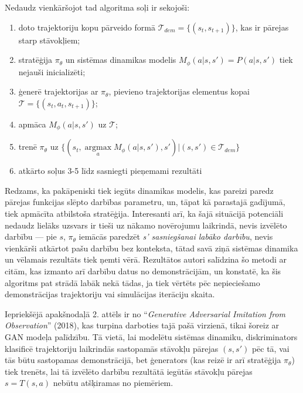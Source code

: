 \documentclass[12pt, a4paper]{article}
\numberwithin{equation}{section} %
\begin{document}
Nedaudz vienkāršojot tad algoritma soļi ir sekojoši:

\begin{enumerate}
    \item doto trajektoriju kopu pārveido formā $\mathcal{T}_{dem}=\lbrace (s_t, s_{t+1}) \rbrace$, kas ir pārejas starp stāvokļiem;
    \item stratēģija $\pi_{\theta}$ un sistēmas dinamikas modelis $M_{\phi}(a \vert s,s')=P(a \vert s, s')$ tiek nejauši inicializēti;
    \item ģenerē trajektorijas ar $\pi_{\theta}$, pievieno trajektorijas elementus kopai $\mathcal{T}=\lbrace (s_t, a_t, s_{t+1}) \rbrace$;
    \item apmāca $M_{\phi}(a \vert s, s')$ uz $\mathcal{T}$;
    \item trenē $\pi_{\theta}$ uz $\lbrace (s_t, \operatorname*{argmax}\limits_a M_{\phi}(a \vert s, s'), s')\vert (s, s') \in \mathcal{T}_{dem} \rbrace$
    \item atkārto soļus 3-5 līdz sasniegti pieņemami rezultāti
\end{enumerate}

Redzams, ka pakāpeniski tiek iegūts dinamikas modelis, kas pareizi paredz pārejas funkcijas slēpto darbības parametru, un, tāpat kā parastajā gadījumā, tiek apmācīta atbilstoša stratēģija. Interesanti arī, ka šajā situācijā potenciāli nedaudz lielāks uzsvars ir tieši uz nākamo novērojumu laikrindā, nevis izvēlēto darbību --- pie $s$, $\pi_{\theta}$ iemācās paredzēt \textit{s' sasniegšanai labāko darbību}, nevis vienkārši atkārtot pašu darbību bez konteksta, tātad savā ziņā sistēmas dinamika un vēlamais rezultāts tiek ņemti vērā. Rezultātos autori salīdzina šo metodi ar citām, kas izmanto arī darbību datus no demonstrācijām, un konstatē, ka šis algoritms pat strādā labāk nekā tādas, ja tiek vērtēts pēc nepieciešamo demonstrācijas trajektoriju vai simulācijas iterāciju skaita.

Iepriekšējā apakšnodaļā 2. attēls ir no ``\textit{Generative Adversarial Imitation from Observation}'' \cite{torabi2018behavioral} (2018), kas turpina darboties tajā pašā virzienā, tikai šoreiz ar GAN modeļa palīdzību. Tā vietā, lai modelētu sistēmas dinamiku, diskriminators klasificē trajektoriju laikrindās sastopamās stāvokļu pārejas $(s, s')$ pēc tā, vai tās būtu sastopamas demonstrācijā, bet ģenerators (kas reizē ir arī stratēģija $\pi_{\theta}$) tiek trenēts, lai tā izvēlēto darbību rezultātā iegūtās stāvokļu pārejas $s=T(s,a)$ nebūtu atšķiramas no piemēriem.
\end{document}
